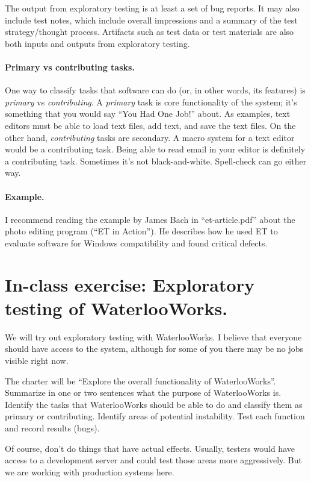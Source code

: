 \documentclass[11pt]{article}
\begin{document}
The output from exploratory testing is at least a set of bug
reports. It may also include test notes, which include overall
impressions and a summary of the test strategy/thought
process. Artifacts such as test data or test materials are also both
inputs and outputs from exploratory testing.

\paragraph{Primary vs contributing tasks.}
One way to classify tasks that software can do (or, in other words, its features) is
\emph{primary} vs \emph{contributing}. A \emph{primary} task is core functionality of
the system; it's something that you would say ``You Had One Job!'' about. As examples,
text editors must be able to load text files, add text, and save the text files.
On the other hand, \emph{contributing} tasks are secondary. A macro system for a text
editor would be a contributing task. Being able to read email in your editor is
definitely a contributing task. Sometimes it's not black-and-white. Spell-check
can go either way.

\paragraph{Example.} I recommend reading the example by James Bach in ``et-article.pdf''
about the photo editing program (``ET in Action''). He describes how he used ET to evaluate
software for Windows compatibility and found critical defects.

\vspace*{-1em}
\section*{In-class exercise: Exploratory testing of WaterlooWorks.}
\vspace*{-1em}
We will try out exploratory testing with WaterlooWorks. I believe that everyone should
have access to the system, although for some of you there may be no jobs visible
right now. 

The charter will be ``Explore the overall functionality of WaterlooWorks''. Summarize
in one or two sentences what the purpose of WaterlooWorks is. Identify the tasks that
WaterlooWorks should be able to do and classify them as primary or contributing. Identify
areas of potential instability. Test each function and record results (bugs).

Of course, don't do things that have actual effects. Usually, testers would have access 
to a development server and could test those areas more aggressively. But we are working
with production systems here.
\end{document}
